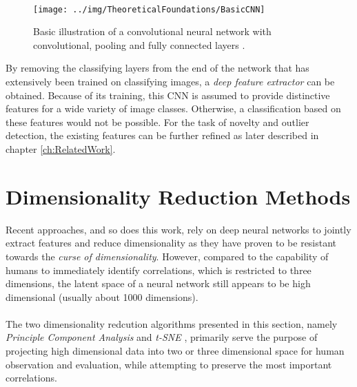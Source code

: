 \\
\begin{figure}[H]
\texttt{[image: ../img/TheoreticalFoundations/BasicCNN]}
\caption{Basic illustration of a convolutional neural network with convolutional, pooling and fully connected layers \cite{https://engmrk.com/convolutional-neural-network-3/}.}
\label{fig:BasicCNN}
\end{figure}
\noindent By removing the classifying layers from the end of the network that has extensively been trained on classifying images, a \textit{deep feature extractor} can be obtained. Because of its training, this CNN is assumed to provide distinctive features for a wide variety of image classes. Otherwise, a classification based on these features would not be possible. For the task of novelty and outlier detection, the existing features can be further refined as later described in chapter \ref{ch:RelatedWork}.



\section{Dimensionality Reduction Methods}
\label{sec:DimensionalityReductionMethods}
Recent approaches, and so does this work, rely on deep neural networks to jointly extract features and reduce dimensionality as they have proven to be resistant towards the \textit{curse of dimensionality}. However, compared to the capability of humans to immediately identify correlations, which is restricted to three dimensions, the latent space of a neural network still appears to be high dimensional (usually about 1000 dimensions).\\
\\
The two dimensionality redcution algorithms presented in this section, namely \textit{Principle Component Analysis} \cite{PCA} and \textit{t-SNE} \cite{tSNE}, primarily serve the purpose of projecting high dimensional data into two or three dimensional space for human observation and evaluation, while attempting to preserve the most important correlations. 

